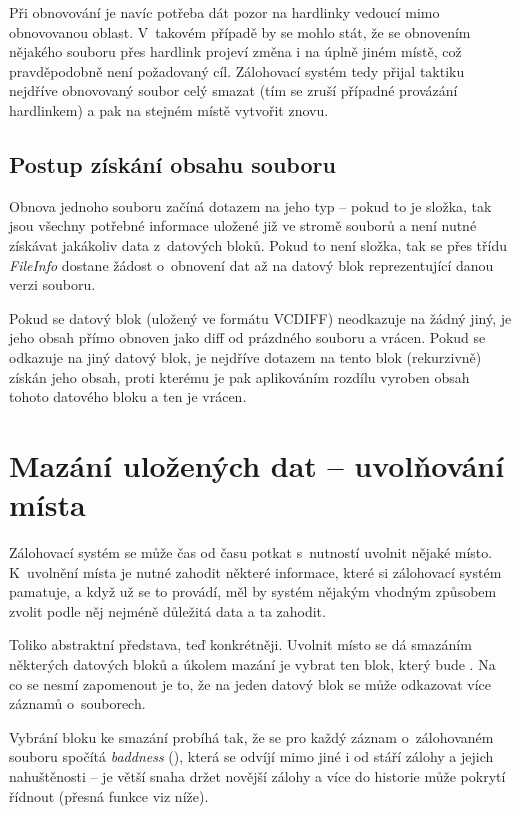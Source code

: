 Při obnovování je navíc potřeba dát pozor na hardlinky vedoucí mimo obnovovanou
oblast. V~takovém případě by se mohlo stát, že se obnovením nějakého souboru
přes hardlink projeví změna i na úplně jiném místě, což pravděpodobně není
požadovaný cíl. Zálohovací systém tedy přijal taktiku nejdříve obnovovaný soubor
celý smazat (tím se zruší případné provázání hardlinkem) a pak na stejném místě
vytvořit znovu.

\subsection{Postup získání obsahu souboru}

Obnova jednoho souboru začíná dotazem na jeho typ -- pokud to je složka, tak
jsou všechny potřebné informace uložené již ve stromě souborů a není nutné
získávat jakákoliv data z~datových bloků. Pokud to není složka, tak se přes
třídu {\it FileInfo} dostane žádost o~obnovení dat až na datový blok
reprezentující danou verzi souboru.

Pokud se datový blok (uložený ve formátu \gls{VCDIFF}) neodkazuje na žádný jiný,
je jeho obsah přímo obnoven jako diff od prázdného souboru a vrácen. Pokud se
odkazuje na jiný datový blok, je nejdříve dotazem na tento blok (rekurzivně)
získán jeho obsah, proti kterému je pak aplikováním rozdílu vyroben obsah tohoto
datového bloku a ten je vrácen.

\section{Mazání uložených dat -- uvolňování místa}

Zálohovací systém se může čas od času potkat s~nutností uvolnit nějaké místo.
K~uvolnění místa je nutné zahodit některé informace, které si zálohovací systém
pamatuje, a když už se to provádí, měl by systém nějakým vhodným způsobem zvolit
podle něj nejméně důležitá data a ta zahodit.

Toliko abstraktní představa, teď konkrétněji. Uvolnit místo se dá smazáním
některých datových bloků a úkolem mazání je vybrat ten blok, který bude
. Na co se nesmí zapomenout je to, že na jeden datový blok
se může odkazovat více záznamů o~souborech.

Vybrání bloku ke smazání probíhá tak, že se pro každý záznam o~zálohovaném
souboru spočítá {\it baddness} (), která se odvíjí mimo jiné
i od stáří zálohy a jejich nahuštěnosti -- je větší snaha držet novější zálohy
a více do historie může pokrytí řídnout (přesná funkce viz níže).

